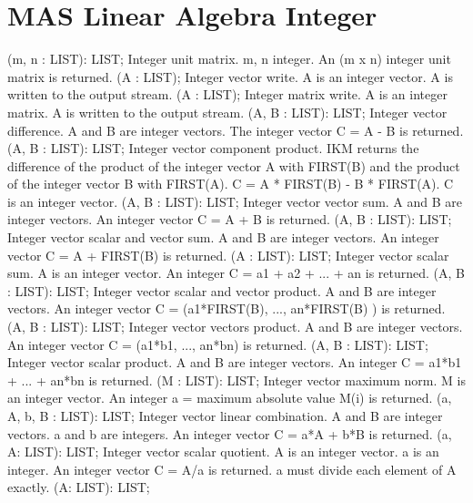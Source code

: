 \section{ MAS Linear Algebra Integer  } 
 (m, n : LIST): LIST; \eproc
\bcom Integer unit matrix. m, n integer. An (m x n) integer unit
matrix is returned.  \ecom 
{} (A : LIST); \eproc
\bcom Integer vector write. A is an integer vector. A is written
to the output stream.  \ecom 
{} (A : LIST); \eproc
\bcom Integer matrix write. A is an integer matrix. A is written
to the output stream.  \ecom 
{} (A, B : LIST): LIST; \eproc
\bcom Integer vector difference. A and B are integer vectors.
The integer vector C = A - B is returned.  \ecom 
{} (A, B : LIST): LIST; \eproc
\bcom Integer vector component product. IKM returns the difference of
the product of the integer vector A with FIRST(B) and the product of 
the integer vector B with FIRST(A). C = A * FIRST(B) - B * FIRST(A).
C is an integer vector.  \ecom 
{} (A, B : LIST): LIST; \eproc
\bcom Integer vector vector sum. A and B are integer vectors.
An integer vector C = A + B is returned.  \ecom 
{} (A, B : LIST): LIST; \eproc
\bcom Integer vector scalar and vector sum. A and B are integer vectors.
An integer vector C = A + FIRST(B) is returned.  \ecom 
{} (A : LIST): LIST; \eproc
\bcom Integer vector scalar sum. A is an integer vector. An integer
C = a1 + a2 + ... + an is returned.  \ecom 
{} (A, B : LIST): LIST; \eproc
\bcom Integer vector scalar and vector product. A and B are integer vectors.
An integer vector C = (a1*FIRST(B), ..., an*FIRST(B) ) is returned.  \ecom 
{} (A, B : LIST): LIST; \eproc
\bcom Integer vector vectors product. A and B are integer vectors.
An integer vector C = (a1*b1, ..., an*bn) is returned.  \ecom 
{} (A, B : LIST): LIST; \eproc
\bcom Integer vector scalar product. A and B are integer vectors.
An integer C = a1*b1 + ... + an*bn is returned.  \ecom 
{} (M : LIST): LIST; \eproc
\bcom Integer vector maximum norm. M is an integer vector.
An integer a = maximum absolute value M(i) is returned.  \ecom 
{} (a, A, b, B : LIST): LIST; \eproc
\bcom Integer vector linear combination. A and B are integer vectors.
a and b are integers. An integer vector C = a*A + b*B is returned.  \ecom 
{} (a, A: LIST): LIST; \eproc
\bcom Integer vector scalar quotient. A is an integer vector.
a is an integer. An integer vector C = A/a is returned. 
a must divide each element of A exactly.  \ecom 
{} (A: LIST): LIST; \eproc
